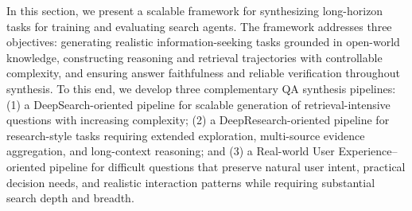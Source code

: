 \documentclass{huawei}
\begin{document}



In this section, we present a scalable framework for synthesizing long-horizon tasks for training and evaluating search agents. The framework addresses three objectives: generating realistic information-seeking tasks grounded in open-world knowledge, constructing reasoning and retrieval trajectories with controllable complexity, and ensuring answer faithfulness and reliable verification throughout synthesis. To this end, we develop three complementary QA synthesis pipelines: (1) a DeepSearch-oriented pipeline for scalable generation of retrieval-intensive questions with increasing complexity; (2) a DeepResearch-oriented pipeline for research-style tasks requiring extended exploration, multi-source evidence aggregation, and long-context reasoning; and (3) a Real-world User Experience–oriented pipeline for difficult questions that preserve natural user intent, practical decision needs, and realistic interaction patterns while requiring substantial search depth and breadth.%
\end{document}
